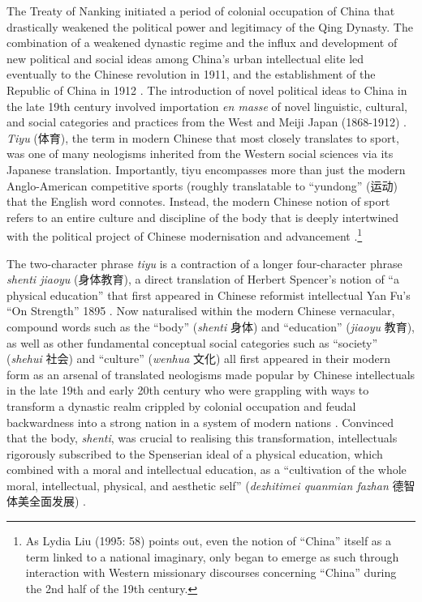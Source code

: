     The Treaty of Nanking initiated a period of colonial occupation of China that drastically weakened the political power and legitimacy of the Qing Dynasty. The combination of a weakened dynastic regime and the influx and development of new political and social ideas among China's urban intellectual elite led eventually to the Chinese revolution in 1911, and the establishment of the Republic of China in 1912 \citep{Mitter2008}.  The introduction of novel political ideas to China in the late 19th century involved importation \textit{en masse} of novel linguistic, cultural, and social categories and practices from the West and Meiji Japan (1868-1912) \citep{Liu1995}. \textit{Tiyu} (体育), the term in modern Chinese that most closely translates to sport, was one of many neologisms inherited from the Western social sciences via its Japanese translation.  Importantly,  tiyu encompasses more than just the modern Anglo-American competitive sports (roughly translatable to ``yundong'' (运动) that the English word connotes.  Instead, the modern Chinese notion of sport refers to an entire culture and discipline of the body that is deeply intertwined with the political project of Chinese modernisation and advancement \citep{Morris2004}.\footnote{As Lydia Liu (1995: 58) points out, even the notion of “China” itself as a term linked to a national imaginary, only began to emerge as such through interaction with Western missionary discourses concerning ``China'' during the 2nd half of the 19th century.}

    The two-character phrase \textit{tiyu} is a contraction of a longer four-character phrase \textit{shenti jiaoyu} (身体教育), a direct translation of Herbert Spencer’s notion of  ``a physical education'' that first appeared in Chinese reformist intellectual Yan Fu’s ``On Strength'' 1895 \citep[9-10]{Morris2004}.  Now naturalised within the modern Chinese vernacular, compound words such as the ``body'' (\textit{shenti} 身体) and ``education'' (\textit{jiaoyu} 教育), as well as other fundamental conceptual social categories such as ``society'' (\textit{shehui} 社会) and ``culture'' (\textit{wenhua} 文化) all first appeared in their modern form as an arsenal of translated neologisms made popular by Chinese intellectuals in the late 19th and early 20th century who were grappling with ways to transform a dynastic realm crippled by colonial occupation and feudal backwardness into a strong nation in a system of modern nations \citep{Pusey1983;Schwartz1964;Liu 1995;Huters2005}.   Convinced that the body, \textit{shenti}, was crucial to realising this transformation, intellectuals rigorously subscribed to the Spenserian ideal of a physical education, which combined with a moral and intellectual education, as a ``cultivation of the whole moral, intellectual, physical, and aesthetic self'' (\textit{dezhitimei quanmian fazhan} 德智体美全面发展) \citep[10]{Morris2004}.

